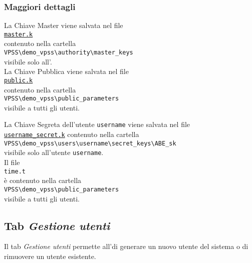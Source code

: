 \documentclass[a4paper,twoside,10pt,openany]{scrbook}
\begin{document}
\subsubsection*{Maggiori dettagli}
La Chiave Master viene salvata nel file\\
\texttt{\hyperref[sec:format_pk]{master.k}}\\
contenuto nella cartella\\
\texttt{VPSS\textbackslash demo\_vpss\textbackslash authority\textbackslash master\_keys}\\
visibile solo all'\auth.\\

La Chiave Pubblica viene salvata nel file\\
\texttt{\hyperref[sec:format_pk]{public.k}}\\
contenuto nella cartella\\
\texttt{VPSS\textbackslash demo\_vpss\textbackslash public\_parameters}\\
visibile a tutti gli utenti.

La Chiave Segreta dell'utente \texttt{username} viene salvata nel file\\
\texttt{\hyperref[sec:format_sk]{username\_secret.k}}
contenuto nella cartella\\
\texttt{VPSS\textbackslash demo\_vpss\textbackslash users\textbackslash username\textbackslash secret\_keys\textbackslash ABE\_sk}\\
visibile solo all'utente \texttt{username}.\\

Il file \\
\texttt{time.t}\\
è contenuto nella cartella\\
\texttt{VPSS\textbackslash demo\_vpss\textbackslash public\_parameters}\\
visibile a tutti gli utenti.
%
\subsection{Tab \emph{Gestione utenti}}\label{sec:tab_gestione}
%
Il tab \emph{Gestione utenti} permette all'\auth di generare un nuovo utente del sistema o di rimuovere un utente esistente.
%
\end{document}
